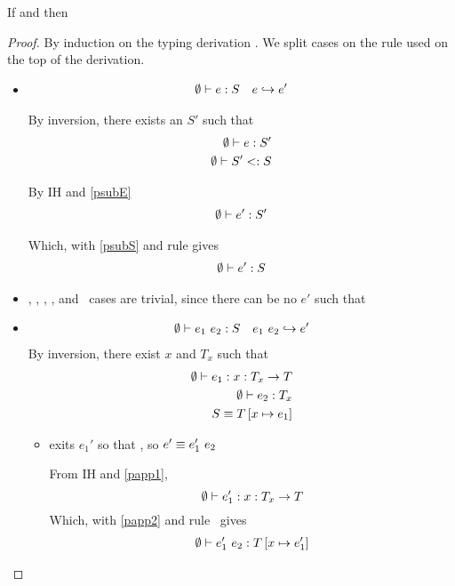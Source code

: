 \begin{theorem}[Preservation]
	If  and  then 
\end{theorem}
	
\begin{proof}
By induction on the typing derivation .
We split cases on the rule used on the top of the derivation.

\begin{itemize}
\item\tsub 
\begin{align*}
\emptyset \vdash e : S && {e}\hookrightarrow {e'}
\end{align*}

By inversion, there exists an $S'$ such that 
\begin{align}
\emptyset \vdash e : S' 	\label{psubE}\\
{\emptyset}\vdash {S'}<:{S}		\label{psubS}
\end{align}

By IH and \ref{psubE}
\begin{align}
\emptyset \vdash e' : S'
\end{align}

Which, with \ref{psubS} and rule  gives
\begin{align}
\emptyset \vdash e' : S
\end{align}

\item	{}, 
		, 
		\tconst, 
		,
		 and
		\tgen\
cases are trivial, since there can be no $e'$ such that 	

\item {}
\begin{align*}
\emptyset \vdash {e_1} \ {e_2} : S && {{e_1} \ {e_2}}\hookrightarrow {e'} 
\end{align*}
By inversion, there exist $x$ and $T_x$ such that 
\begin{align}
\emptyset \vdash e_1 : x : T_x \rightarrow T 		\label{papp1}\\
\emptyset \vdash e_2 : T_x					\label{papp2}\\
S \equiv T \left[ x \mapsto e_1 \right] 					\label{pappS}
\end{align}

\begin{itemize}
	\item exits $e_1'$ so that , so $e' \equiv {e_1'} \ {e_2}$

From IH and \ref{papp1}, $$ \emptyset \vdash e_1' : x : T_x \rightarrow T$$
Which, with \ref{papp2} and rule \tapp\ gives 
\begin{align}
\emptyset \vdash {e_1'} \ {e_2} : T \left[ x \mapsto e_1' \right]  \label{prese1}
\end{align}


\end{itemize}
\end{itemize}
\end{proof}
